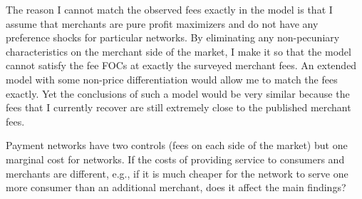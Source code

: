\documentclass[main.tex]{subfiles}
\begin{document}
\begin{refsection}
The reason I cannot match the observed fees exactly in the model is that I assume that merchants are pure profit maximizers and do not have any preference shocks for particular networks.
By eliminating any non-pecuniary characteristics on the merchant side of the market, I make it so that the model cannot satisfy the fee FOCs at exactly the surveyed merchant fees.
An extended model with some non-price differentiation would allow me to match the fees exactly.
Yet the conclusions of such a model would be very similar because the fees that I currently recover are still extremely close to the published merchant fees.




\begin{refcommentnoclear}
Payment networks have two controls (fees on each side of the market) but one marginal cost for networks.
If the costs of providing service to consumers and merchants are different, e.g., if it is much cheaper for the network to serve one more consumer than an additional merchant, does it affect the main findings?
\end{refcommentnoclear}


\end{refsection}
\end{document}
